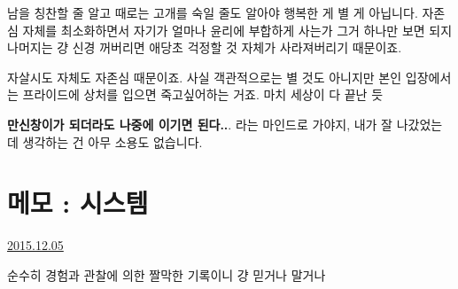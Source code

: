 남을 칭찬할 줄 알고 때로는 고개를 숙일 줄도 알아야 행복한 게 별 게 아닙니다.
자존심 자체를 최소화하면서 자기가 얼마나 윤리에 부합하게 사는가 그거 하나만 보면 되지
나머지는 걍 신경 꺼버리면 애당초 걱정할 것 자체가 사라져버리기 때문이죠.
\vspace{5mm}

자살시도 자체도 자존심 때문이죠.
사실 객관적으로는 별 것도 아니지만 본인 입장에서는 프라이드에 상처를 입으면 죽고싶어하는 거죠. 마치 세상이 다 끝난 듯
\vspace{5mm}

\textbf{만신창이가 되더라도 나중에 이기면 된다..}. 라는 마인드로 가야지, 내가 잘 나갔었는데 생각하는 건 아무 소용도 없습니다.
\vspace{5mm}






\section{메모 : 시스템}
\href{https://www.kockoc.com/Apoc/528655}{2015.12.05}

\vspace{5mm}

순수히 경험과 관찰에 의한 짤막한 기록이니 걍 믿거나 말거나
\vspace{5mm}

